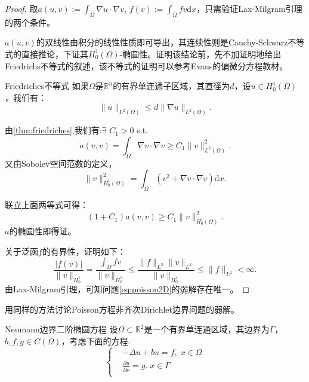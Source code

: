 \documentclass[lang=cn,10pt,newtx]{elegantbook}
\newcommand{\dif}{\mathrm{d}}
\newcommand{\pdfFrac}[2]{\frac{\partial #1}{\partial #2}}
\newcommand{\norm}[1]{\|#1\|}
\begin{document}
\begin{proof}
  取$a(u,v):=\int_{\Omega}\nabla u\cdot\nabla v$, $f(v):=\int_{\Omega}fv\dif x$，只需验证Lax-Milgram引理的两个条件。

  $a(u,v)$的双线性由积分的线性性质即可导出，其连续性则是Cauchy-Schwarz不等式的直接推论，下证其$H_{0}^{1}(\Omega)$-椭圆性。证明该结论前，先不加证明地给出Friedrichs不等式的叙述，该不等式的证明可以参考Evans的偏微分方程教材。
  \begin{proposition}{Friedriches不等式}
    \label{thm:friedriches}
    如果$\Omega$是$\mathbb{R}^{n}$的有界单连通子区域，其直径为$d$，设$u\in H_{0}^{1}(\Omega)$，我们有：
    \begin{equation}
      \norm{u}_{L^{2}(\Omega)}\le d\norm{\nabla u}_{L^{2}(\Omega)}.
    \end{equation}
  \end{proposition}
  由\ref{thm:friedriches},我们有:$\exists$ $C_{1}>0$ s.t. 
  \begin{equation}
    a(v,v)=\int_{\Omega}\nabla v\cdot\nabla v\ge C_{1}\norm{v}_{L^{2}(\Omega)}^{2}.
  \end{equation}
  又由Sobolev空间范数的定义，
  \begin{equation}
    \norm{v}_{H_{0}^{1}(\Omega)}^{2}=\int_{\Omega}(v^{2}+\nabla v\cdot\nabla v)\dif x.
  \end{equation}

  联立上面两等式可得：
  \begin{equation}
    (1+C_{1})a(v,v)\ge C_{1}\norm{v}_{H_{0}^{1}(\Omega)}^{2}.
  \end{equation}
  $a$的椭圆性即得证。

  关于泛函$f$的有界性，证明如下：
  \begin{equation}
    \frac{|f(v)|}{\norm{v}_{H_{0}^{1}}}=\frac{\int_{\Omega}fv}{\norm{v}_{H_{0}^{1}}}\le\frac{\norm{f}_{L^{2}}\norm{v}_{L^{2}}}{\norm{v}_{H_{0}^{1}}}\le\norm{f}_{L^{2}}<\infty.
  \end{equation}
  由Lax-Milgram引理，可知问题\eqref{eq:poisson2D}的弱解存在唯一。
\end{proof}
\begin{exercise}
  用同样的方法讨论Poisson方程非齐次Dirichlet边界问题的弱解。
\end{exercise}
\begin{definition}{Neumann边界二阶椭圆方程}
  设$\Omega\subset\mathbb{R}^{2}$是一个有界单连通区域，其边界为$\Gamma$，$b,f,g\in C(\Omega)$，考虑下面的方程:
  \begin{equation}
    \label{eq:ellipticNeumann}
    \left\{
      \begin{aligned}
      &-\Delta u+bu=f,\; x\in\Omega\\
      &\pdfFrac{u}{\nu}=g.\; x\in\Gamma\\
      \end{aligned}
    \right.
  \end{equation}
\end{definition}
\end{document}
